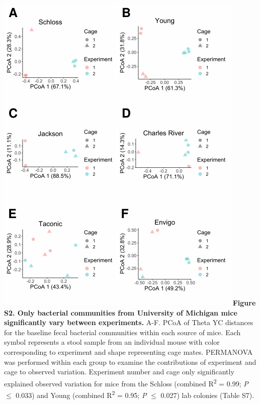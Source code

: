 \documentclass[11pt,]{article}
\begin{document}
\newpage

\includegraphics{figure_S2.pdf} \textbf{Figure S2. Only bacterial
communities from University of Michigan mice significantly vary between
experiments.} A-F. PCoA of Theta YC distances for the baseline fecal
bacterial communities within each source of mice. Each symbol represents
a stool sample from an individual mouse with color corresponding to
experiment and shape representing cage mates. PERMANOVA was performed
within each group to examine the contributions of experiment and cage to
observed variation. Experiment number and cage only significantly
explained observed variation for mice from the Schloss (combined
R\textsuperscript{2} = 0.99; \emph{P} \(\le\) 0.033) and Young (combined
R\textsuperscript{2} = 0.95; \emph{P} \(\le\) 0.027) lab colonies (Table
S7).

\newpage
\end{document}
